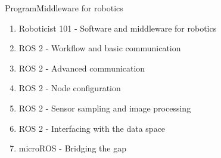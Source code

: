 \begin{frame}{Program}{Middleware for robotics}
  \begin{enumerate}
    \item Roboticist 101 - Software and middleware for robotics
    \item ROS 2 - Workflow and basic communication
    \item ROS 2 - Advanced communication
    \item ROS 2 - Node configuration
    \item ROS 2 - Sensor sampling and image processing
    \item ROS 2 - Interfacing with the data space
    \item microROS - Bridging the gap
  \end{enumerate}
\end{frame}

